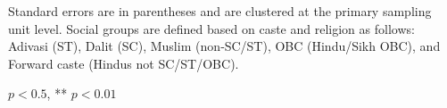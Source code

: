 \documentclass[12pt]{article}
\begin{document}
\newpage
\begin{table}[!htbp]
    \centering
    \begin{threeparttable}
        \caption{: Variables used in the nonparametric reweighting predict pregnancy}
        \label{tab:regression}

        \scriptsize
        \setlength{\tabcolsep}{1pt}
        \renewcommand{\arraystretch}{0.81}

        {}

        \begin{tablenotes}
            \item Standard errors are in parentheses and are clustered at the primary sampling unit level. Social groups are defined based on caste and religion as follows: Adivasi (ST), Dalit (SC), Muslim (non‐SC/ST), OBC (Hindu/Sikh OBC), and Forward caste (Hindus not SC/ST/OBC).
            \item * $p<0.5$, ** $p<0.01$
        \end{tablenotes}
    \end{threeparttable}
\end{table}


\newpage
\end{document}
